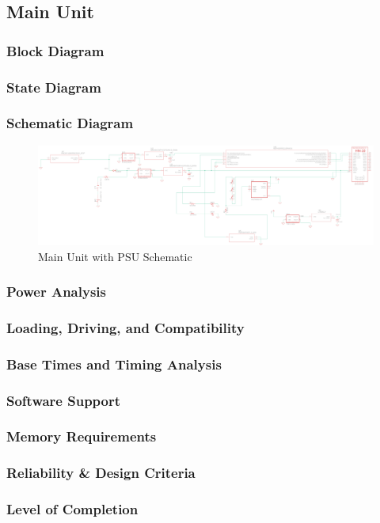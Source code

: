 \subsection{Main Unit}
\subsubsection{Block Diagram}
\subsubsection{State Diagram}

\subsubsection{Schematic Diagram}
\begin{landscape}
  \begin{center}
  \begin{figure}[H]
    \includegraphics[width=\pdfpagewidth,height=0.65\textheight]{../Modular Design/Main-Unit/Figures/main-unit-and-psu.png}
    \caption{Main Unit with PSU Schematic}
    \label{fig:main-with-psu-schematic}
  \end{figure}
  \end{center}
  \end{landscape}
\subsubsection{Power Analysis}
\subsubsection{Loading, Driving, and Compatibility}
\subsubsection{Base Times and Timing Analysis}
\subsubsection{Software Support}
\subsubsection{Memory Requirements}
\subsubsection{Reliability \& Design Criteria}
\subsubsection{Level of Completion}
